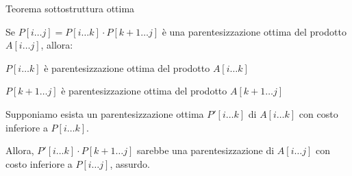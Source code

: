 \begin{frame}{Teorema sottostruttura ottima}

\vspace{-6pt}
\begin{myboxtitle}[Teorema]
\alert{Se} $P[i \ldots j] =  P[i \ldots k]  \cdot P[k+1 \ldots j]$ è una parentesizzazione ottima del prodotto $A[i \ldots j]$, \alert{allora}:
\BI
\item $P[i \ldots k]$ è parentesizzazione ottima del prodotto $A[i \ldots k]$
\item $P[k+1 \ldots j]$ è parentesizzazione ottima del prodotto $A[k+1 \ldots j]$
\EI
\end{myboxtitle}

\begin{myboxtitle}
\BIL
\item Supponiamo esista un parentesizzazione ottima $P'[i \ldots k]$ di $A[i \ldots k]$ con costo inferiore a $P[i \ldots k]$.
\item Allora, $P'[i \ldots k] \cdot P[k+1 \ldots j]$ sarebbe una parentesizzazione di $A[i \ldots j]$ con costo inferiore a $P[i \ldots j]$, assurdo.
\EIL
\end{myboxtitle}

\end{frame}

%
%
%
%
%
%

